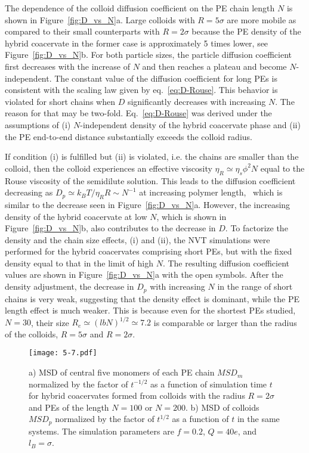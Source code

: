\documentclass[journal=mamobx, manuscript=article]{achemso}
\begin{document}
The dependence of the colloid diffusion coefficient on the PE chain length $N$ is shown in Figure~\ref{fig:D_vs_N}a. Large colloids with $R = 5 \sigma$ are more mobile as compared to their small counterparts with $R = 2 \sigma$ because the PE density of the hybrid coacervate in the former case is approximately 5 times lower, see Figure~\ref{fig:D_vs_N}b. For both particle sizes, the particle diffusion coefficient first decreases with the increase of $N$ and then reaches a plateau and become $N$-independent. The constant value of the diffusion coefficient for long PEs is consistent with the scaling law given by eq.~\ref{eq:D-Rouse}. This behavior is violated for short chains when $D$ significantly decreases with increasing $N$. The reason for that may be two-fold. Eq.~\ref{eq:D-Rouse} was derived under the assumptions of (i) $N$-independent density of the hybrid coacervate phase and (ii) the PE end-to-end distance substantially exceeds the colloid radius.~\cite{artem2022hybrid} 

If condition (i) is fulfilled but (ii) is violated, i.e. the chains are smaller than the colloid, then the colloid experiences an effective viscosity $\eta_{R} \simeq \eta_{s} \phi^{2} N$ equal to the Rouse viscosity of the semidilute solution. This leads to the diffusion coefficient decreasing as $D_{p} \simeq k_B T / \eta_{R} R \sim N^{-1} $ at increasing polymer length,~\cite{cai2011mobility} which is similar to the decrease seen in Figure~\ref{fig:D_vs_N}a. However, the increasing density of the hybrid coacervate at low $N$, which is shown in Figure~\ref{fig:D_vs_N}b, also contributes to the decrease in $D$. To factorize the density and the chain size effects, (i) and (ii), the NVT simulations were performed for the hybrid coacervates comprising short PEs, but with the fixed density equal to that in the limit of high $N$. The resulting diffusion coefficient values are shown in Figure~\ref{fig:D_vs_N}a with the open symbols. After the density adjustment, the decrease in $D_{p}$ with increasing $N$ in the range of short chains is very weak, suggesting that the density effect is dominant, while the PE length effect is much weaker. This is because even for the shortest PEs studied, $N=30$, their size $R_{e} \simeq \left( l b N \right)^{1/2} \simeq 7.2 $ is comparable or larger than the radius of the colloids, $R  = 5 \sigma$ and $R = 2 \sigma$. 





\begin{figure}[ht]
\centering
\texttt{[image: 5-7.pdf]}
\caption{
a) MSD of central five monomers of each PE chain $MSD_{m}$ normalized by the factor of $t^{-1/2}$ as a function of simulation time $t$ for hybrid coacervates formed from colloids with the radius $R = 2\sigma$ and PEs of the length  $N=100$ or $N = 200$.  
b) MSD of colloids $MSD_{p}$ normalized by the factor of $t^{1/2}$ as a function of $t$ in the same systems. The simulation parameters are $f = 0.2$, $Q = 40e$, and $l_{B} = \sigma$.}
\label{fig:largeQ}
\end{figure}
\end{document}
